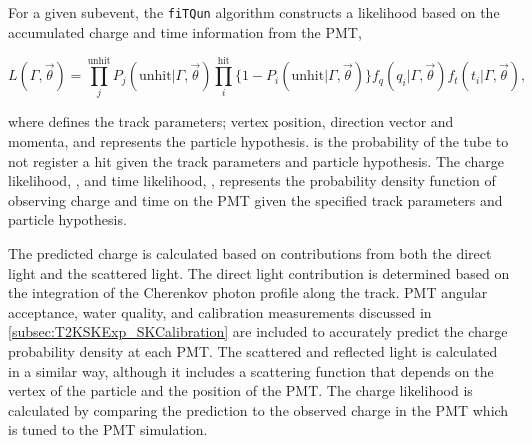 For a given subevent, the \texttt{fiTQun} algorithm constructs a likelihood based on the accumulated charge  and time information  from the  PMT,

\begin{equation}
  L(\Gamma, \vec{\theta}) = \prod^{\text{unhit}}_{j} P_{j}(\text{unhit}|\Gamma,\vec{\theta}) \prod^{\text{hit}}_{i} \{ 1 - P_{i}(\text{unhit}|\Gamma,\vec{\theta}) \}   f_{q}(q_{i} | \Gamma, \vec{\theta}) f_{t}(t_{i} | \Gamma, \vec{\theta}),
\end{equation}

where \quickmath{\vec{\theta}} defines the track parameters; vertex position, direction vector and momenta, and \quickmath{\Gamma} represents the particle hypothesis.  is the probability of the  tube to not register a hit given the track parameters and particle hypothesis. The charge likelihood, , and time likelihood, , represents the probability density function of observing charge  and time  on the  PMT given the specified track parameters and particle hypothesis.


The predicted charge is calculated based on contributions from both the direct light and the scattered light. The direct light contribution is determined based on the integration of the Cherenkov photon profile along the track. PMT angular acceptance, water quality, and calibration measurements discussed in \autoref{subsec:T2KSKExp_SKCalibration} are included to accurately predict the charge probability density at each PMT. The scattered and reflected light is calculated in a similar way, although it includes a scattering function that depends on the vertex of the particle and the position of the PMT. The charge likelihood is calculated by comparing the prediction to the observed charge in the PMT which is tuned to the PMT simulation.

